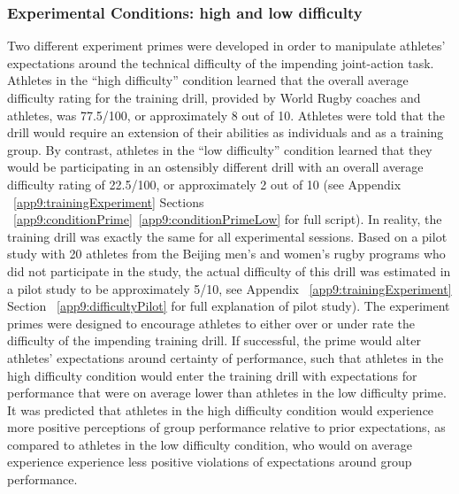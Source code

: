 

\subsubsection{Experimental Conditions: high and low difficulty\label{sect:expPrimes}}
Two different experiment primes were developed in order to manipulate athletes’ expectations around the technical difficulty of the impending joint-action task.  Athletes in the ``high difficulty'' condition learned that the overall average difficulty rating for the training drill, provided by World Rugby coaches and athletes, was 77.5/100, or approximately 8 out of 10.  Athletes were told that the drill would require an extension of their abilities as individuals and as a training group.  By contrast, athletes in the ``low difficulty'' condition learned that they would be participating in an ostensibly different drill with an overall average difficulty rating of 22.5/100, or approximately 2 out of 10 (see Appendix ~\ref{app9:trainingExperiment} Sections ~\ref{app9:conditionPrime}\nobreakdash~\ref{app9:conditionPrimeLow} for full script).  In reality, the training drill was exactly the same for all experimental sessions.  Based on a pilot study with 20 athletes from the Beijing men's and women's rugby programs who did not participate in the study, the actual difficulty of this drill was estimated in a pilot study to be approximately 5/10, see Appendix ~\ref{app9:trainingExperiment} Section ~\ref{app9:difficultyPilot} for full explanation of pilot study).  The experiment primes were designed to encourage athletes to either over or under rate the difficulty of the impending training drill. If successful, the prime would alter athletes' expectations around certainty of performance, such that athletes in the high difficulty condition would enter the training drill with expectations for performance that were on average lower than athletes in the low difficulty prime. It was predicted that athletes in the high difficulty condition would experience more positive perceptions of group performance relative to prior expectations, as compared to athletes in the low difficulty condition, who would on average experience experience less positive violations of expectations around group performance.


